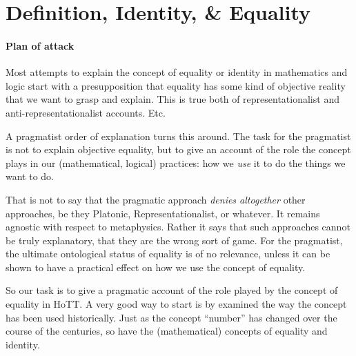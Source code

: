 \documentclass{article}
\begin{document}
\section{Definition, Identity, \& Equality}

\paragraph{Plan of attack \\}

Most attempts to explain the concept of equality or identity in
mathematics and logic start with a presupposition that equality has
some kind of objective reality that we want to grasp and explain. This
is true both of representationalist and anti-representationalist
accounts.  Etc.

A pragmatist order of explanation turns this around. The task for the
pragmatist is not to explain objective equality, but to give an
account of the role the concept plays in our (mathematical, logical)
practices: how we \textit{use} it to do the things we want to do.


That is not to say that the pragmatic approach \textit{denies
  altogether} other approaches, be they Platonic, Representationalist,
or whatever. It remains agnostic with respect to metaphysics. Rather
it says that such approaches cannot be truly explanatory, that they
are the wrong sort of game. For the pragmatist, the ultimate
ontological status of equality is of no relevance, unless it can be
shown to have a practical effect on how we use the concept of
equality.

So our task is to give a pragmatic account of the role played by the
concept of equality in HoTT. A very good way to start is by examined
the way the concept has been used historically. Just as the concept
``number'' has changed over the course of the centuries, so have the
(mathematical) concepts of equality and identity.
\end{document}
